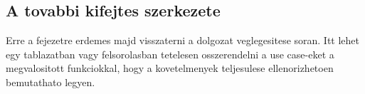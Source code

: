 ﻿%

\subsection{A tovabbi kifejtes szerkezete}

Erre a fejezetre erdemes majd visszaterni a dolgozat veglegesitese soran. Itt lehet egy tablazatban vagy felsorolasban tetelesen osszerendelni a use case-eket a megvalositott funkciokkal, hogy a kovetelmenyek teljesulese ellenorizhetoen bemutathato legyen.